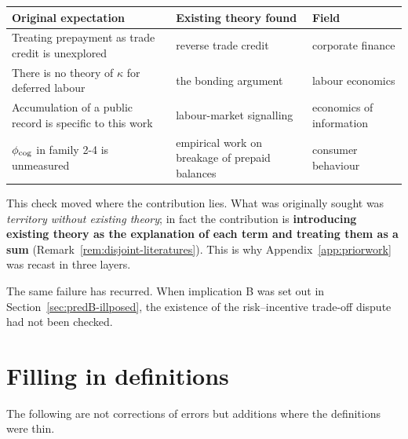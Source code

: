 \begin{center}
\begin{tabularx}{\textwidth}{@{}lXl@{}}
\toprule
Original expectation & Existing theory found & Field \\
\midrule
Treating prepayment as trade credit is unexplored & reverse trade credit \cite{mateut2014,daripa2011} & corporate finance \\
There is no theory of $\kappa$ for deferred labour & the bonding argument \cite{akerlof1986} & labour economics \\
Accumulation of a public record is specific to this work & labour-market signalling \cite{spence1973} & economics of information \\
$\phi_{\rm cog}$ in family 2-4 is unmeasured & empirical work on breakage of prepaid balances \cite{nber2026pnbl} & consumer behaviour \\
\bottomrule
\end{tabularx}
\label{tab:prior-theory-check}
\end{center}

This check moved where the contribution lies. What was originally sought was \emph{territory
without existing theory}; in fact the contribution is \textbf{introducing existing theory as the
explanation of each term and treating them as a sum}
(Remark~\ref{rem:disjoint-literatures}). This is why Appendix~\ref{app:priorwork} was recast in
three layers.

The same failure has recurred. When implication B was set out in
Section~\ref{sec:predB-illposed}, the existence of the risk--incentive trade-off dispute had not
been checked.

\section{Filling in definitions}

The following are not corrections of errors but additions where the definitions were thin.

